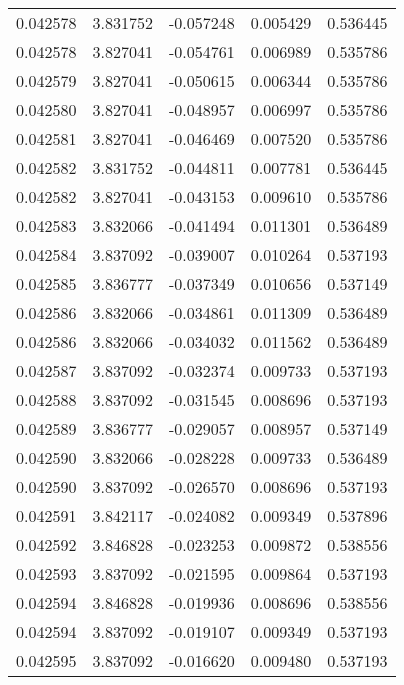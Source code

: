 \begin{tabular}{lrrrr}
0.042578    &  3.831752 & -0.057248 &  0.005429 &             0.536445 \\
0.042578    &  3.827041 & -0.054761 &  0.006989 &             0.535786 \\
0.042579    &  3.827041 & -0.050615 &  0.006344 &             0.535786 \\
0.042580    &  3.827041 & -0.048957 &  0.006997 &             0.535786 \\
0.042581    &  3.827041 & -0.046469 &  0.007520 &             0.535786 \\
0.042582    &  3.831752 & -0.044811 &  0.007781 &             0.536445 \\
0.042582    &  3.827041 & -0.043153 &  0.009610 &             0.535786 \\
0.042583    &  3.832066 & -0.041494 &  0.011301 &             0.536489 \\
0.042584    &  3.837092 & -0.039007 &  0.010264 &             0.537193 \\
0.042585    &  3.836777 & -0.037349 &  0.010656 &             0.537149 \\
0.042586    &  3.832066 & -0.034861 &  0.011309 &             0.536489 \\
0.042586    &  3.832066 & -0.034032 &  0.011562 &             0.536489 \\
0.042587    &  3.837092 & -0.032374 &  0.009733 &             0.537193 \\
0.042588    &  3.837092 & -0.031545 &  0.008696 &             0.537193 \\
0.042589    &  3.836777 & -0.029057 &  0.008957 &             0.537149 \\
0.042590    &  3.832066 & -0.028228 &  0.009733 &             0.536489 \\
0.042590    &  3.837092 & -0.026570 &  0.008696 &             0.537193 \\
0.042591    &  3.842117 & -0.024082 &  0.009349 &             0.537896 \\
0.042592    &  3.846828 & -0.023253 &  0.009872 &             0.538556 \\
0.042593    &  3.837092 & -0.021595 &  0.009864 &             0.537193 \\
0.042594    &  3.846828 & -0.019936 &  0.008696 &             0.538556 \\
0.042594    &  3.837092 & -0.019107 &  0.009349 &             0.537193 \\
0.042595    &  3.837092 & -0.016620 &  0.009480 &             0.537193 \\

\end{tabular}
